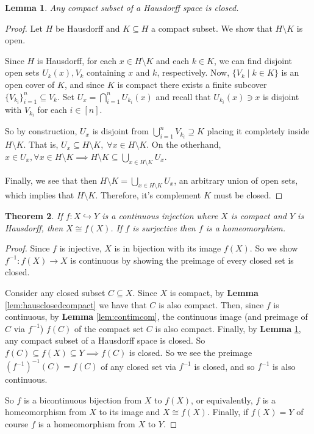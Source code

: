 \documentclass[addpoints,10pt]{exam}
\theoremstyle{plain}
\newcommand{\theoremname}{Theorem}
\newtheorem{thm}{\protect\theoremname}
\theoremstyle{definition}
\theoremstyle{plain}
\newtheorem{lem}[thm]{Lemma}
\theoremstyle{definition}
\begin{document}
\begin{lem}\label{lem:comhausclosed}
  Any compact subset of a Hausdorff space is closed.
\end{lem}
  \begin{proof}
    Let $H$ be Hausdorff and $K\subseteq H$ a compact subset. We show that $H\setminus K$ is open. 

    Since $H$ is Hausdorff, for each $x\in H\setminus K$ and each $k\in K$, we can find disjoint open sets $U_{k}(x),V_{k}$ containing $x$ and $k$, respectively. Now, $\{V_{k}\mid k\in K\}$ is an open cover of $K$, and since $K$ is compact there exists a finite subcover $\{V_{k_{i}}\}_{i=1}^{n}\subseteq {V_{k}}$. Set $U_{x}=\bigcap_{i=1}^{n}U_{k_{i}}(x)$ and recall that $U_{k_{i}}(x)\ni x$ is disjoint with $V_{k_{i}}$ for each $i\in [n]$. 
    
    So by construction, $U_{x}$ is disjoint from $\bigcup_{i=1}^{n} V_{k_{i}}\supseteq K$ placing it completely inside $H\setminus K.$ That is, $U_{x}\subseteq H\setminus K,\;\forall x\in H\setminus K$. On the otherhand, $x\in U_{x},\forall x\in H\setminus K\implies H\setminus K\subseteq \bigcup_{x\in H\setminus K}U_{x}.$

    Finally, we see that then $H\setminus K=\bigcup_{x\in H\setminus K} U_{x}$, an arbitrary union of open sets, which implies that $H\setminus K$. Therefore, it's complement $K$ must be closed.

  \end{proof}

    \begin{thm}\label{thm:contimjhom} If $f:X\hookrightarrow Y$ is a continuous injection where $X$ is compact and $Y$ is Hausdorff, then $X\cong f(X)$. If $f$ is surjective then $f$ is a homeomorphism.
    \end{thm}
  \begin{proof}
    Since $f$ is injective, $X$ is in bijection with its image $f(X)$. So we show $f^{-1}:f(X)\to X$ is continuous by showing the preimage of every closed set is closed.

    Consider any closed subset $C\subseteq X$. Since $X$ is compact, by \textbf{Lemma }\ref{lem:hausclosedcompact} we have that $C$ is also compact. Then, since $f$ is continuous, by \textbf{Lemma }\ref{lem:contimcom}, the continuous image (and preimage of $C$ via $f^{-1}$) $f(C)$ of the compact set $C$ is also compact. Finally, by \textbf{Lemma }\ref{lem:comhausclosed}, any compact subset of a Hausdorff space is closed. So $f(C)\subseteq f(X)\subseteq Y\implies f(C)$ is closed. So we see the preimage $(f^{-1})^{-1}(C)=f(C)$ of any closed set via $f^{-1}$ is closed, and so $f^{-1}$ is also continuous. 
    
    So $f$ is a bicontinuous bijection from $X$ to $f(X)$, or equivalently, $f$ is a homeomorphism from $X$ to its image and $X\cong f(X)$. Finally, if $f(X)=Y$ of course $f$ is a homeomorphism from $X$ to $Y$.

  \end{proof}
\end{document}
